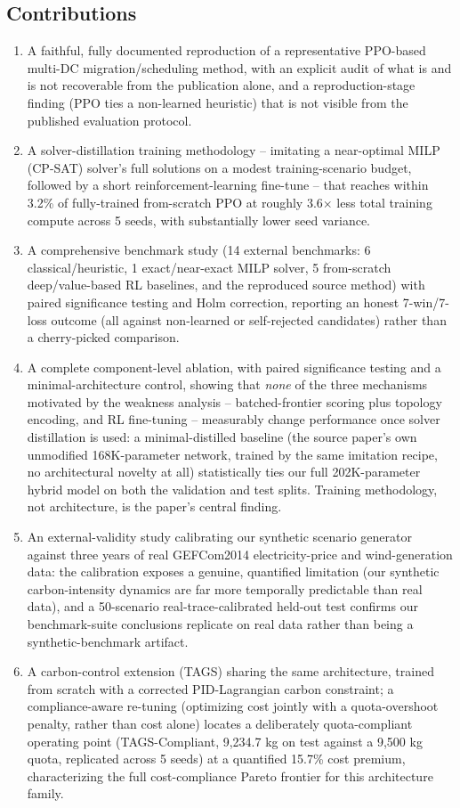 \documentclass[journal]{IEEEtran}
\begin{document}
\subsection{Contributions}
\begin{enumerate}
\item A faithful, fully documented reproduction of a representative PPO-based multi-DC migration/scheduling method, with an explicit audit of what is and is not recoverable from the publication alone, and a reproduction-stage finding (PPO ties a non-learned heuristic) that is not visible from the published evaluation protocol.
\item A solver-distillation training methodology -- imitating a near-optimal MILP (CP-SAT) solver's full solutions on a modest training-scenario budget, followed by a short reinforcement-learning fine-tune -- that reaches within 3.2\% of fully-trained from-scratch PPO at roughly 3.6$\times$ less total training compute across 5 seeds, with substantially lower seed variance.
\item A comprehensive benchmark study (14 external benchmarks: 6 classical/heuristic, 1 exact/near-exact MILP solver, 5 from-scratch deep/value-based RL baselines, and the reproduced source method) with paired significance testing and Holm correction, reporting an honest 7-win/7-loss outcome (all against non-learned or self-rejected candidates) rather than a cherry-picked comparison.
\item A complete component-level ablation, with paired significance testing and a minimal-architecture control, showing that \emph{none} of the three mechanisms motivated by the weakness analysis -- batched-frontier scoring plus topology encoding, and RL fine-tuning -- measurably change performance once solver distillation is used: a minimal-distilled baseline (the source paper's own unmodified 168K-parameter network, trained by the same imitation recipe, no architectural novelty at all) statistically ties our full 202K-parameter hybrid model on both the validation and test splits. Training methodology, not architecture, is the paper's central finding.
\item An external-validity study calibrating our synthetic scenario generator against three years of real GEFCom2014 electricity-price and wind-generation data: the calibration exposes a genuine, quantified limitation (our synthetic carbon-intensity dynamics are far more temporally predictable than real data), and a 50-scenario real-trace-calibrated held-out test confirms our benchmark-suite conclusions replicate on real data rather than being a synthetic-benchmark artifact.
\item A carbon-control extension (TAGS) sharing the same architecture, trained from scratch with a corrected PID-Lagrangian carbon constraint; a compliance-aware re-tuning (optimizing cost jointly with a quota-overshoot penalty, rather than cost alone) locates a deliberately quota-compliant operating point (TAGS-Compliant, 9{,}234.7 kg on test against a 9{,}500 kg quota, replicated across 5 seeds) at a quantified 15.7\% cost premium, characterizing the full cost-compliance Pareto frontier for this architecture family.
\end{enumerate}
\end{document}

